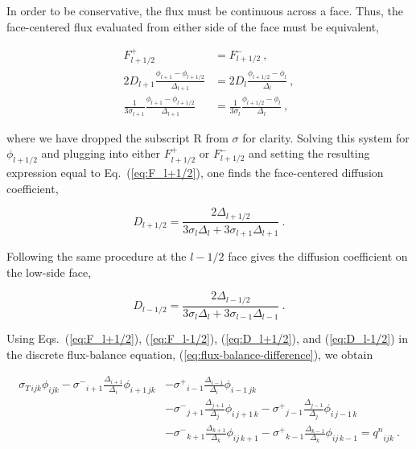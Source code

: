\documentclass[preprint,12pt]{elsarticle}
\newcommand{\qn}{\ensuremath{q^n}}
\newcommand{\Di}{\ensuremath{\Delta_i}}
\newcommand{\Dj}{\ensuremath{\Delta_j}}
\newcommand{\Dk}{\ensuremath{\Delta_k}}
\newcommand{\sigT}{\ensuremath{\sigma_{T\,ijk}}}
\newcommand{\sigm}{\ensuremath{\sigma^{-}}}
\newcommand{\sigp}{\ensuremath{\sigma^{+}}}
\begin{document}
In order to be conservative, the flux must be continuous across a
face.  Thus, the face-centered flux evaluated from either side of the
face must be equivalent,

\begin{equation}
  \begin{aligned}
    F_{l+1/2}^{+} &= F_{l+1/2}^{-}\:,\\
    2D_{l+1}\frac{\phi_{l+1} - \phi_{l+1/2}}{\Delta_{l+1}} &=
    2D_{l}\frac{\phi_{l+1/2} - \phi_{l}}{\Delta_l}\:,\\
    \frac{1}{3\sigma_{l+1}}\frac{\phi_{l+1} - \phi_{l+1/2}}{\Delta_{l+1}} &=
    \frac{1}{3\sigma_{l}}\frac{\phi_{l+1/2} - \phi_{l}}{\Delta_l}\:,
  \end{aligned}
\end{equation}

where we have dropped the subscript $\mathrm{R}$ from $\sigma$ for
clarity.  Solving this system for $\phi_{l+1/2}$ and plugging into
either $F_{l+1/2}^{+}$ or $F_{l+1/2}^{-}$ and setting the resulting
expression equal to Eq.~(\ref{eq:F_l+1/2}), one finds the
face-centered diffusion coefficient,

\begin{equation}
  D_{l+1/2} = \frac{2\Delta_{l+1/2}}{3\sigma_l\Delta_l + 
    3\sigma_{l+1}\Delta_{l+1}}\:.
  \label{eq:D_l+1/2}
\end{equation}

Following the same procedure at the $l-1/2$ face gives the diffusion
coefficient on the low-side face,

\begin{equation}
  D_{l-1/2} = \frac{2\Delta_{l-1/2}}{3\sigma_l\Delta_l + 
    3\sigma_{l-1}\Delta_{l-1}}\:.
  \label{eq:D_l-1/2} 
\end{equation}

Using Eqs.~(\ref{eq:F_l+1/2}), (\ref{eq:F_l-1/2}), (\ref{eq:D_l+1/2}),
and (\ref{eq:D_l-1/2}) in the discrete flux-balance equation,
(\ref{eq:flux-balance-difference}), we obtain

\begin{equation}
  \begin{aligned}
    \sigT\phi_{ijk} 
    - \sigm_{i+1}\frac{\Delta_{i+1}}{\Di}\phi_{i+1\,jk} &
    - \sigp_{i-1}\frac{\Delta_{i-1}}{\Di}\phi_{i-1\,jk}\\
    &- \sigm_{j+1}\frac{\Delta_{j+1}}{\Dj}\phi_{i\,j+1\,k}
    - \sigp_{j-1}\frac{\Delta_{j-1}}{\Dj}\phi_{i\,j-1\,k}\\ 
    &- \sigm_{k+1}\frac{\Delta_{k+1}}{\Dk}\phi_{ij\,k+1}
    - \sigp_{k-1}\frac{\Delta_{k-1}}{\Dk}\phi_{ij\,k-1}
    = \qn_{ijk}\:.
  \end{aligned}
  \label{eq:discrete-diffusion}
\end{equation}
\end{document}
